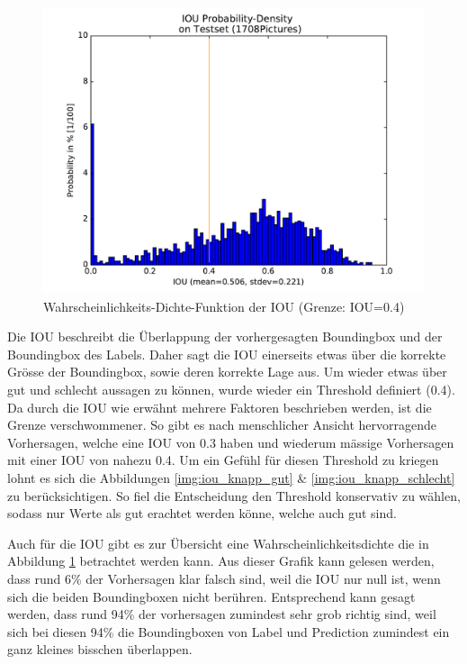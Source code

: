 \begin{figure}
	\centering
	\includegraphics[width=.7\textwidth]{Kapitel/70Resultate/Bilder/IOUprobDensity.pdf}
	\caption{Wahrscheinlichkeits-Dichte-Funktion der IOU (Grenze: IOU=0.4)}
	\label{img:iou_dichte}
\end{figure}


Die IOU beschreibt die Überlappung der vorhergesagten Boundingbox und der Boundingbox des Labels. 
Daher sagt die IOU einerseits etwas über die korrekte Grösse der Boundingbox, sowie deren korrekte Lage aus. 
Um wieder etwas über gut und schlecht aussagen zu können, wurde wieder ein Threshold definiert (0.4).
Da durch die IOU wie erwähnt mehrere Faktoren beschrieben werden, ist die Grenze verschwommener. 
So gibt es nach menschlicher Ansicht hervorragende Vorhersagen, welche eine IOU von 0.3 haben und wiederum mässige Vorhersagen mit einer IOU von nahezu 0.4.
Um ein Gefühl für diesen Threshold zu kriegen lohnt es sich die Abbildungen \ref{img:iou_knapp_gut} \& \ref{img:iou_knapp_schlecht} zu berücksichtigen.
So fiel die Entscheidung den Threshold konservativ zu wählen, sodass nur Werte als gut erachtet werden könne, welche auch gut sind. 

Auch für die IOU gibt es zur Übersicht eine Wahrscheinlichkeitsdichte die in Abbildung \ref{img:iou_dichte} betrachtet werden kann.
Aus dieser Grafik kann gelesen werden, dass rund 6\% der Vorhersagen klar falsch sind, weil die IOU nur null ist, wenn sich die beiden Boundingboxen nicht berühren. Entsprechend kann gesagt werden, dass rund 94\% der vorhersagen zumindest sehr grob richtig sind, weil sich bei diesen 94\% die Boundingboxen von Label und Prediction zumindest ein ganz kleines bisschen überlappen. 
